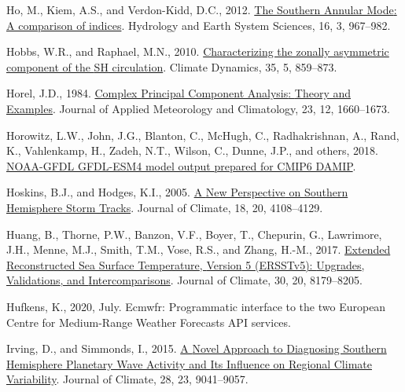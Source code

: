 \documentclass[12pt,oneside]{reedthesis}
\newlength{\cslhangindent}
\newenvironment{CSLReferences}[2] %
 {%
  \setlength{\parindent}{0pt}
  \ifodd #1 \everypar{\setlength{\hangindent}{\cslhangindent}}\ignorespaces\fi
  \ifnum #2 > 0
  \setlength{\parskip}{#2\baselineskip}
  \fi
 }%
 {}
\begin{document}
\begin{CSLReferences}{1}{0}
\leavevmode{}%
Ho, M., Kiem, A.S., and Verdon-Kidd, D.C., 2012. \href{https://doi.org/10.5194/hess-16-967-2012}{The {Southern Annular Mode}: A comparison of indices}. Hydrology and Earth System Sciences, 16, 3, 967--982.

\leavevmode{}%
Hobbs, W.R., and Raphael, M.N., 2010. \href{https://doi.org/10.1007/s00382-009-0663-z}{Characterizing the zonally asymmetric component of the {SH} circulation}. Climate Dynamics, 35, 5, 859--873.

\leavevmode{}%
Horel, J.D., 1984. \href{https://doi.org/10.1175/1520-0450(1984)023\%3C1660:CPCATA\%3E2.0.CO;2}{Complex {Principal Component Analysis}: {Theory} and {Examples}}. Journal of Applied Meteorology and Climatology, 23, 12, 1660--1673.

\leavevmode{}%
Horowitz, L.W., John, J.G., Blanton, C., McHugh, C., Radhakrishnan, A., Rand, K., Vahlenkamp, H., Zadeh, N.T., Wilson, C., Dunne, J.P., and others, 2018. \href{https://doi.org/10.22033/ESGF/CMIP6.1408}{NOAA-GFDL GFDL-ESM4 model output prepared for CMIP6 DAMIP}.

\leavevmode{}%
Hoskins, B.J., and Hodges, K.I., 2005. \href{https://doi.org/10.1175/JCLI3570.1}{A {New Perspective} on {Southern Hemisphere Storm Tracks}}. Journal of Climate, 18, 20, 4108--4129.

\leavevmode{}%
Huang, B., Thorne, P.W., Banzon, V.F., Boyer, T., Chepurin, G., Lawrimore, J.H., Menne, M.J., Smith, T.M., Vose, R.S., and Zhang, H.-M., 2017. \href{https://doi.org/10.1175/JCLI-D-16-0836.1}{Extended {Reconstructed Sea Surface Temperature}, {Version} 5 ({ERSSTv5}): {Upgrades}, {Validations}, and {Intercomparisons}}. Journal of Climate, 30, 20, 8179--8205.

\leavevmode{}%
Hufkens, K., 2020, July. Ecmwfr: {Programmatic} interface to the two {European Centre} for {Medium-Range Weather Forecasts API} services.

\leavevmode{}%
Irving, D., and Simmonds, I., 2015. \href{https://doi.org/10.1175/JCLI-D-15-0287.1}{A {Novel Approach} to {Diagnosing Southern Hemisphere Planetary Wave Activity} and {Its Influence} on {Regional Climate Variability}}. Journal of Climate, 28, 23, 9041--9057.


\end{CSLReferences}
\end{document}
